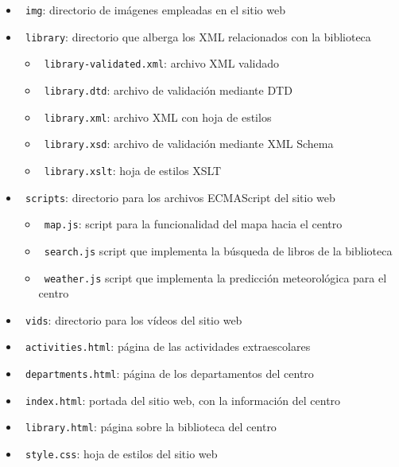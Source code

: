 \documentclass[11pt]{article}
\begin{document}
        \begin{itemize}
            \item \texttt{\faFolder{} img}: directorio de imágenes empleadas en el sitio web
            \item \texttt{\faFolder{} library}: directorio que alberga los XML relacionados con la biblioteca
                \begin{itemize}
                    \item \texttt{\faFileCodeO{} library-validated.xml}: archivo XML validado
                    \item \texttt{\faFileCodeO{} library.dtd}: archivo de validación mediante DTD
                    \item \texttt{\faFileCodeO{} library.xml}: archivo XML con hoja de estilos
                    \item \texttt{\faFileCodeO{} library.xsd}: archivo de validación mediante XML Schema
                    \item \texttt{\faFileCodeO{} library.xslt}: hoja de estilos XSLT
                \end{itemize}
            \item \texttt{\faFolder{} scripts}: directorio para los archivos ECMAScript del sitio web
                \begin{itemize}
                    \item \texttt{\faTerminal{} map.js}: script para la funcionalidad del mapa hacia el centro
                    \item \texttt{\faTerminal{} search.js} script que implementa la búsqueda de libros de la biblioteca
                    \item \texttt{\faTerminal{} weather.js} script que implementa la predicción meteorológica para el centro
                \end{itemize}
            \item \texttt{\faFolder{} vids}: directorio para los vídeos del sitio web
            \item \texttt{ activities.html}: página de las actividades extraescolares
            \item \texttt{ departments.html}: página de los departamentos del centro
            \item \texttt{ index.html}: portada del sitio web, con la información del centro
            \item \texttt{ library.html}: página sobre la biblioteca del centro
            \item \texttt{ style.css}: hoja de estilos del sitio web
        \end{itemize}
\end{document}
